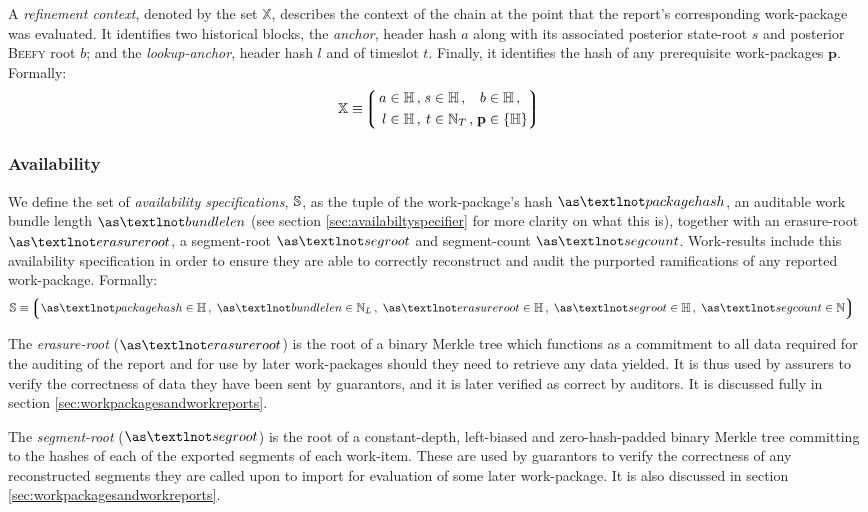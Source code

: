 A \emph{refinement context}, denoted by the set $\mathbb{X}$, describes the context of the chain at the point that the report's corresponding work-package was evaluated. It identifies two historical blocks, the \emph{anchor}, header hash $a$ along with its associated posterior state-root $s$ and posterior \textsc{Beefy} root $b$; and the \emph{lookup-anchor}, header hash $l$ and of timeslot $t$. Finally, it identifies the hash of any prerequisite work-packages $\mathbf{p}$. Formally:
\begin{equation}
  \mathbb{X} \equiv \tuple{\,\begin{alignedat}{5}
    \isa{a&}{\hash}\,,\; \isa{&s&}{\hash}\,,\; \isa{&b&}{\hash}\,,\;\\
    \isa{l&}{\hash}\,,\; \isa{&t&}{\timeslot}\,,\; \isa{&\mathbf{p}&}{\{\hash\}}
  \end{alignedat}}
\end{equation}

\subsubsection{Availability}
We define the set of \emph{availability specifications}, $\mathbb{S}$, as the tuple of the work-package's hash $\as¬packagehash$, an auditable work bundle length $\as¬bundlelen$ (see section \ref{sec:availabiltyspecifier} for more clarity on what this is), together with an erasure-root $\as¬erasureroot$, a segment-root $\as¬segroot$ and segment-count $\as¬segcount$. Work-results include this availability specification in order to ensure they are able to correctly reconstruct and audit the purported ramifications of any reported work-package. Formally:
\begin{align}
  \avspec &\equiv \tuple{
    \isa{\as¬packagehash}{\hash}\,,\;
    \isa{\as¬bundlelen}{\bloblength}\,,\;
    \isa{\as¬erasureroot}{\hash}\,,\;
    \isa{\as¬segroot}{\hash}\,,\;
    \isa{\as¬segcount}{\N}
  }
\end{align}

The \emph{erasure-root} ($\as¬erasureroot$) is the root of a binary Merkle tree which functions as a commitment to all data required for the auditing of the report and for use by later work-packages should they need to retrieve any data yielded. It is thus used by assurers to verify the correctness of data they have been sent by guarantors, and it is later verified as correct by auditors. It is discussed fully in section \ref{sec:workpackagesandworkreports}.

The \emph{segment-root} ($\as¬segroot$) is the root of a constant-depth, left-biased and zero-hash-padded binary Merkle tree committing to the hashes of each of the exported segments of each work-item. These are used by guarantors to verify the correctness of any reconstructed segments they are called upon to import for evaluation of some later work-package. It is also discussed in section \ref{sec:workpackagesandworkreports}.


